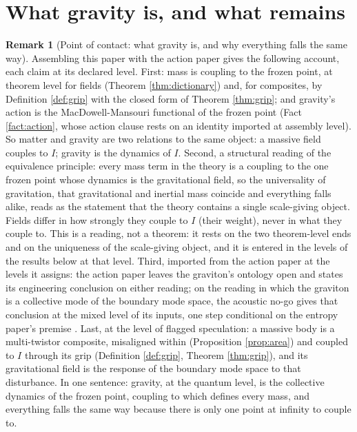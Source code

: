 \documentclass[11pt]{article}
\theoremstyle{definition}
\newtheorem{remark}[theorem]{Remark}
\begin{document}
\section{What gravity is, and what remains}\label{sec:gravity}

\begin{remark}[Point of contact: what gravity is, and why everything falls the same way]\label{rem:gravity}
Assembling this paper with the action paper gives the following account, each claim at its declared level. First: mass is coupling to the frozen point, at theorem level for fields (Theorem \ref{thm:dictionary}) and, for composites, by Definition \ref{def:grip} with the closed form of Theorem \ref{thm:grip}; and gravity's action is the MacDowell-Mansouri functional of the frozen point (Fact \ref{fact:action}, whose action clause rests on an identity imported at assembly level). So matter and gravity are two relations to the same object: a massive field couples to $I$; gravity is the dynamics of $I$. Second, a structural reading of the equivalence principle: every mass term in the theory is a coupling to the one frozen point whose dynamics is the gravitational field, so the universality of gravitation, that gravitational and inertial mass coincide and everything falls alike, reads as the statement that the theory contains a single scale-giving object. Fields differ in how strongly they couple to $I$ (their weight), never in what they couple to. This is a reading, not a theorem: it rests on the two theorem-level ends and on the uniqueness of the scale-giving object, and it is entered in the levels of the results below at that level. Third, imported from the action paper at the levels it assigns: the action paper leaves the graviton's ontology open and states its engineering conclusion on either reading; on the reading in which the graviton is a collective mode of the boundary mode space, the acoustic no-go gives that conclusion at the mixed level of its inputs, one step conditional on the entropy paper's premise \cite[\S\S5--6]{ButlerT10}. Last, at the level of flagged speculation: a massive body is a multi-twistor composite, misaligned within (Proposition \ref{prop:area}) and coupled to $I$ through its grip (Definition \ref{def:grip}, Theorem \ref{thm:grip}), and its gravitational field is the response of the boundary mode space to that disturbance. In one sentence: gravity, at the quantum level, is the collective dynamics of the frozen point, coupling to which defines every mass, and everything falls the same way because there is only one point at infinity to couple to.
\end{remark}
\end{document}

